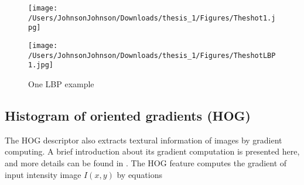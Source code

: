 \begin{figure}
\begin{minipage}[t]{0.5\linewidth}
\centering
\texttt{[image: /Users/JohnsonJohnson/Downloads/thesis\_1/Figures/Theshot1.jpg]}
\end{minipage}%
\begin{minipage}[t]{0.5\linewidth}
\centering
\texttt{[image: /Users/JohnsonJohnson/Downloads/thesis\_1/Figures/TheshotLBP1.jpg]}
\end{minipage}
\caption{One LBP example}
\label{LBPdemoshot}
\end{figure}


\subsection{Histogram of oriented gradients (HOG)}
The HOG \cite{HOG} descriptor also extracts textural information of images by gradient computing. A brief introduction about its gradient computation is presented here, and more details can be found in \cite{HOG}. The HOG feature computes the gradient of input intensity  image $I(x, y)$ by equations 

